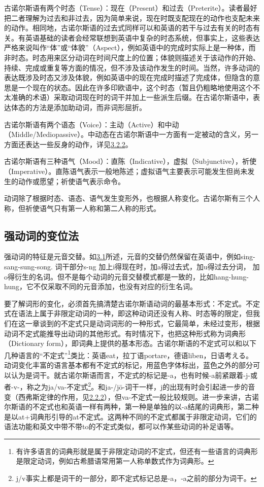古诺尔斯语有两个时态（Tense）：现在（Present）和过去（Preterite）。读者最好把二者理解为过去和非过去，因为简单来说，现在时既支配现在的动作也支配未来的动作。相同地，古诺尔斯语的过去式同样可以和英语的若干与过去有关的时态有关。有英语基础的读者会经常联想到英语中复杂的时态系统，但事实上，这些表达严格来说叫作``体''或``体貌''（Aspect），例如英语中的完成时实际上是一种体，而非时态。时态用来区分动词在时间尺度上的位置；体貌则描述关于该动作的开始、持续、完成或重复等方面的情况，但不涉及该动作发生的时间。当然，许多动词的表达既涉及时态又涉及体貌，例如英语中的现在完成时描述了完成体，但隐含的意思是一个现在的状态。因此在许多印欧语中，这个时态（暂且仍粗略地使用这个不太准确的术语）采取动词现在时的词干并加上一些派生后缀。在古诺尔斯语中，表达体态的方法是添加助动词，而非词形屈折。

古诺尔斯语有两个语态（Voice）：主动（Active）和中动（Middle/Mediopassive）。中动态在古诺尔斯语中一方面有一定被动的含义，另一方面还表达一些反身的动作，详见\hyperref[ux5f3aux52a8ux8bcdux7684ux4e2dux52a8ux8bcdux5c3e]{3.2.2}。

古诺尔斯语有三种语气（Mood）：直陈（Indicative），虚拟（Subjunctive），祈使（Imperative）。直陈语气表示一般地陈述；虚拟语气主要表示可能发生但尚未发生的动作或愿望；祈使语气表示命令。

动词除了根据时态、语态、语气发生变形外，也根据人称变化。古诺尔斯有三个人称，但祈使语气只有第一人称和第二人称的形式。

\subsection{强动词的变位法}\label{ux5f3aux52a8ux8bcdux7684ux53d8ux4f4dux6cd5}

强动词的特征是元音交替。如\hyperref[ux52a8ux8bcdux7684ux6982ux8ff0]{3.1}所述，元音的交替仍然保留在英语中，例如sing-sang-sung-song.
词干部分s-ng 加上i得现在时，加a得过去式，加u得过去分词，
加o得衍生的名词。但不是每个动词的元音交替模式都是一致的，比如hang-hung-hung，它不仅采取不同的元音添加，也没有对应的衍生名词。

要了解词形的变化，必须首先搞清楚古诺尔斯语动词的最基本形式：不定式。不定式在语法上属于非限定动词的一种，即这种动词还没有人称、时态等的限定，但我们在这一章谈到的不定式只是动词词形的一种形式，它最简单，未经过变形，根据动词不定式能推导出动词的其他形式。有时情况下，也把这种形式称为词典形（Dictionary
form），即词典上提供的基本形态。古诺尔斯语的不定式可以和以下几种语言的``不定式''\footnote{有许多语言的词典形就是属于非限定动词的不定式，但还有一些语言的词典形是限定动词，例如古希腊语常用第一人称单数式作为词典形。}类比：英语eat，拉丁语portare，德语liben，日语考える。动词变化丰富的语言基本都有不定式的标记，用蓝色字体标出，蓝色之外的部分可以认为是词干。就古诺尔斯语而言，不定式的标记是-a，也有时候-a前紧跟着-j-或者-v-，称之为ja/va-不定式\footnote{j/v事实上都是词干的一部分，即不定式标记总是-a，-a之前的部分为词干。}。和ja-/jō-词干一样，j的出现有时会引起进一步的音变（西弗斯定律的作用，见\hyperref[ajawa-ux8bcdux5e72]{2.2.2}），但va-不定式一般比较规则。进一步来讲，古诺尔斯语的不定式也和英语一样有两种，第一种是单独的以-a结尾的词典形，第二种是以at+词典形引导的at不定式。这两种不同的不定式都属于非限定动词，它们的语法功能和英文中带不带to的不定式类似，都可以作某些动词的补足语等。

